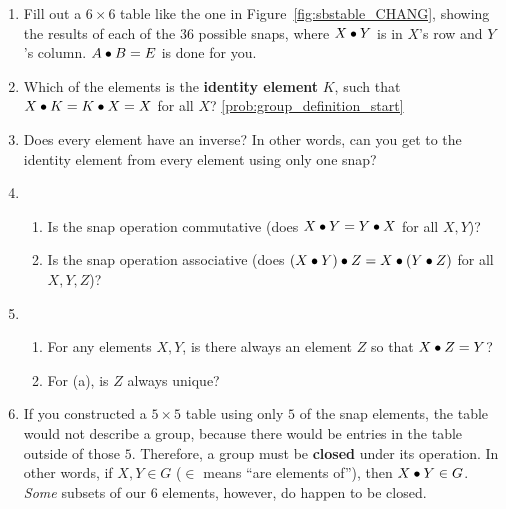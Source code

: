 \documentclass[../gatm.tex]{subfiles}
\begin{document}
\begin{enumerate}
	\item Fill out a $6\times 6$ table like the one in Figure~\ref{fig:sbstable_CHANG}, showing the results of each of the $36$ possible snaps, where $X\bullet Y$ is in $X$'s row and $Y$'s column. %
	      $A\bullet B=E$ is done for you.
	\item Which of the elements is the \textbf{identity element} $K$, such that $X\bullet K = K\bullet X = X$ for all $X$? \ref{prob:group_definition_start}
	\item Does every element have an inverse? In other words, can you get to the identity element from every element using only one snap?
	\item \begin{enumerate}
		      \item Is the snap operation commutative (does $X \bullet Y = Y \bullet X$ for all $X,Y$)?
		      \item Is the snap operation associative (does $(X \bullet Y) \bullet Z = X \bullet (Y\bullet Z)$ for all $X,Y,Z$)?
	      \end{enumerate}
	\item \begin{enumerate}
		      \item For any elements $X, Y$, is there always an element $Z$ so that $X\bullet Z=Y$?
		      \item For (a), is $Z$ always unique?
	      \end{enumerate}
	\item If you constructed a $5\times 5$ table using only $5$ of the snap elements, the table would not describe a group, because there would be entries in the table outside of those $5$.
	      Therefore, a group must be \textbf{closed} under its operation. In other words, if $X,Y\in G$ ($\in$ means ``are elements of''), then $X\bullet Y\in G$.
	      \textit{Some} subsets of our $6$ elements, however, do happen to be closed.


\end{enumerate}
\end{document}
